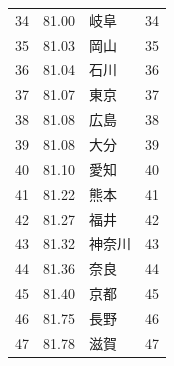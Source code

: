 \begin{table}[ht]
\begin{tabular}{rrlr}
  34 & 81.00 & 岐阜 &  34 \\ 
  35 & 81.03 & 岡山 &  35 \\ 
  36 & 81.04 & 石川 &  36 \\ 
  37 & 81.07 & 東京 &  37 \\ 
  38 & 81.08 & 広島 &  38 \\ 
  39 & 81.08 & 大分 &  39 \\ 
  40 & 81.10 & 愛知 &  40 \\ 
  41 & 81.22 & 熊本 &  41 \\ 
  42 & 81.27 & 福井 &  42 \\ 
  43 & 81.32 & 神奈川 &  43 \\ 
  44 & 81.36 & 奈良 &  44 \\ 
  45 & 81.40 & 京都 &  45 \\ 
  46 & 81.75 & 長野 &  46 \\ 
  47 & 81.78 & 滋賀 &  47 \\ 
   \hline
\end{tabular}
\end{table}








